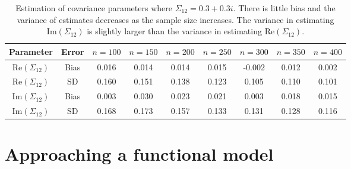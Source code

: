 \documentclass[11pt]{article}
\begin{document}
\begin{table}[h]

\begin{tabular}{|c|c|c|c|c|c|c|c|c|}\hline
Parameter & Error & $n= 100$ & $n= 150$ & $n= 200$ & $n= 250$ & $n= 300$ & $n= 350$ &$n= 400$  \\
\hline\hline
Re$(\Sigma_{12})$ &Bias & 0.016& 0.014 &0.014  &0.015  &-0.002  & 0.012 & 0.002 \\  \hline
Re$(\Sigma_{12})$& SD & 0.160 & 0.151 & 0.138 & 0.123 & { }0.105 & 0.110 & 0.101 \\  \hline\hline
Im$(\Sigma_{12})$&Bias & 0.003 & 0.030 & 0.023 & 0.021 & { }0.003 & 0.018 & 0.015 \\  \hline
Im$(\Sigma_{12})$&SD & 0.168 & 0.173 &  0.157 & 0.133 & { }0.131 & 0.128 & 0.116 \\  \hline
\end{tabular}
\caption{Estimation of covariance parameters where $\Sigma_{12} = 0.3 + 0.3i$. There is little bias and the variance of estimates decreases as the sample size increases. The variance in estimating $\textrm{Im}(\Sigma_{12})$ is slightly larger than the variance in estimating $\textrm{Re}(\Sigma_{12})$.}\label{tab:simu_both}
\end{table}





\section{Approaching a functional model}\label{sec:functional}
\end{document}
